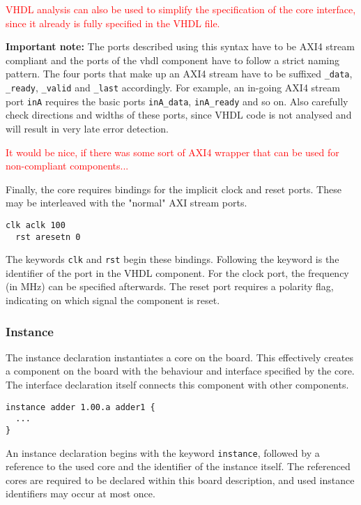 \documentclass{report}
\begin{document}
\textcolor{red}{VHDL analysis can also be used to simplify the specification of the core interface, since it already is fully specified in the VHDL file.}

\textbf{Important note:} The ports described using this syntax have to be AXI4 stream compliant and the ports of the vhdl component have to follow a strict naming pattern. The four ports that make up an AXI4 stream have to be suffixed \texttt{\_data}, \texttt{\_ready}, \texttt{\_valid} and \texttt{\_last} accordingly. For example, an in-going AXI4 stream port \texttt{inA} requires the basic ports \texttt{inA\_data}, \texttt{inA\_ready} and so on. Also carefully check directions and widths of these ports, since VHDL code is not analysed and will result in very late error detection.

\textcolor{red}{It would be nice, if there was some sort of AXI4 wrapper that can be used for non-compliant components...}

Finally, the core requires bindings for the implicit clock and reset ports. These may be interleaved with the "normal" AXI stream ports.

\begin{lstlisting}[language=bdl]
  clk aclk 100
  rst aresetn 0
\end{lstlisting}

The keywords \texttt{clk} and \texttt{rst} begin these bindings. Following the keyword is the identifier of the port in the VHDL component. For the clock port, the frequency (in MHz) can be specified afterwards. The reset port requires a polarity flag, indicating on which signal the component is reset.

\subsubsection{Instance}
The instance declaration instantiates a core on the board. This effectively creates a component on the board with the behaviour and interface specified by the core. The interface declaration itself connects this component with other components.

\begin{lstlisting}[language=bdl]
instance adder 1.00.a adder1 {
  ...
}
\end{lstlisting}

An instance declaration begins with the keyword \texttt{instance}, followed by a reference to the used core and the identifier of the instance itself. The referenced cores are required to be declared within this board description, and used instance identifiers may occur at most once.
\end{document}
